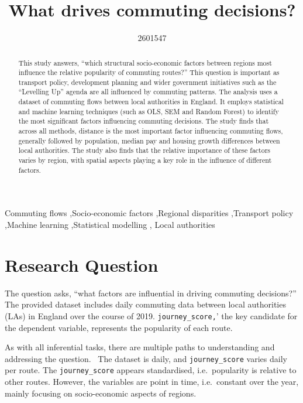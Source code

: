 \documentclass[
  number]{elsarticle}
\begin{document}
\begin{frontmatter}
\title{What drives commuting decisions?}
\author[1]{2601547%
%
}



        
\begin{abstract}
This study answers, ``which structural socio-economic factors between
regions most influence the relative popularity of commuting routes?''
This question is important as transport policy, development planning and
wider government initiatives such as the ``Levelling Up'' agenda are all
influenced by commuting patterns. The analysis uses a dataset of
commuting flows between local authorities in England. It employs
statistical and machine learning techniques (such as OLS, SEM and Random
Forest) to identify the most significant factors influencing commuting
decisions. The study finds that across all methods, distance is the most
important factor influencing commuting flows, generally followed by
population, median pay and housing growth differences between local
authorities. The study also finds that the relative importance of these
factors varies by region, with spatial aspects playing a key role in the
influence of different factors.
\end{abstract}





\begin{keyword}
    Commuting flows \sep Socio-economic factors \sep Regional
disparities \sep Transport policy \sep Machine learning \sep Statistical
modelling \sep 
    Local authorities
\end{keyword}
\end{frontmatter}
    

\section{Research Question}\label{sec-research-question}

The question asks, ``what factors are influential in driving commuting
decisions?'' The provided dataset includes daily commuting data between
local authorities (LAs) in England over the course of 2019.
\texttt{\textquotesingle{}journey\_score,}' the key candidate for the
dependent variable, represents the popularity of each route.

As with all inferential tasks, there are multiple paths to understanding
and addressing the question. ~The dataset is daily, and
\texttt{\textquotesingle{}journey\_score\textquotesingle{}} varies daily
per route. The
\texttt{\textquotesingle{}journey\_score\textquotesingle{}} appears
standardised, i.e.~popularity is relative to other routes. However, the
variables are point in time, i.e.~constant over the year, mainly
focusing on socio-economic aspects of regions.
\end{document}
